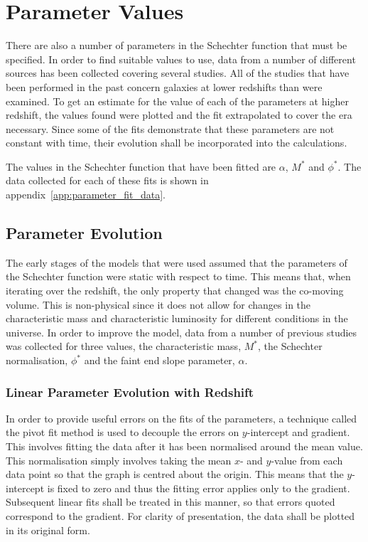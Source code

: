 
\section{Parameter Values} %
\label{sec:parameter_values}
	There are also a number of parameters in the Schechter function that must be specified. In order to find suitable values to use, data from a number of different sources has been collected covering several studies. All of the studies that have been performed in the past concern galaxies at lower redshifts than were examined. To get an estimate for the value of each of the parameters at higher redshift, the values found were plotted and the fit extrapolated to cover the era necessary. Since some of the fits demonstrate that these parameters are not constant with time, their evolution shall be incorporated into the calculations.

	The values in the Schechter function that have been fitted are $\alpha$, $M^{*}$ and $\phi^{*}$. The data collected for each of these fits is shown in appendix~\ref{app:parameter_fit_data}.

	\subsection{Parameter Evolution} %
	\label{sub:parameter_evolution}
		The early stages of the models that were used assumed that the parameters of the Schechter function were static with respect to time. This means that, when iterating over the redshift, the only property that changed was the co-moving volume. This is non-physical since it does not allow for changes in the characteristic mass and characteristic luminosity for different conditions in the universe. In order to improve the model, data from a number of previous studies was collected for three values, the characteristic mass, $M^*$, the Schechter normalisation, $\phi^*$ and the faint end slope parameter, $\alpha$.

		\subsubsection{Linear Parameter Evolution with Redshift} %
		\label{ssub:linear_parameter_evolution_with_redshift}
			In order to provide useful errors on the fits of the parameters, a technique called the pivot fit method is used to decouple the errors on $y$-intercept and gradient. This involves fitting the data after it has been normalised around the mean value. This normalisation simply involves taking the mean $x$- and $y$-value from each data point so that the graph is centred about the origin. This means that the $y$-intercept is fixed to zero and thus the fitting error applies only to the gradient. Subsequent linear fits shall be treated in this manner, so that errors quoted correspond to the gradient. For clarity of presentation, the data shall be plotted in its original form.


